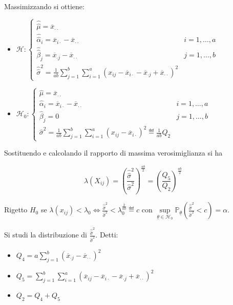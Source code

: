 \documentclass[hidelinks, 10pt]{report}
\begin{document}
Massimizzando si ottiene:
\begin{itemize}
\item $ \mathcal{H}: \begin{cases} \hat{\hat{\mu}} = \overline{x}_{\cdot \cdot} \\ \hat{\hat{\alpha}}_{i} = \overline{x}_{i \cdot} - \overline{x}_{\cdot \cdot} & i = 1, \dotsc, a  \\ \hat{\hat{\beta}}_{j} = \overline{x}_{\cdot j} - \overline{x}_{\cdot \cdot} & j = 1, \dotsc, b \\ \hat{\hat{\sigma}}^{2} = \frac{1}{ab} \sum\limits_{j = 1}^{b} \sum\limits_{i = 1}^{a} (x_{ij} - \overline{x}_{i \cdot} - \overline{x}_{\cdot j} + \overline{x}_{\cdot \cdot})^{2} \end{cases} $
\item $ \mathcal{H}_{0}: \begin{cases} \hat{\mu} = \overline{x}_{\cdot \cdot} \\ \hat{\alpha}_{i} = \overline{x}_{i \cdot} - \overline{x}_{\cdot \cdot} & i = 1, \dotsc, a \\ \hat{\beta}_{j} = 0 & j = 1, \dotsc, b \\ \hat{\sigma}^{2} = \frac{1}{ab} \sum\limits_{j = 1}^{b} \sum\limits_{i = 1}^{a} (x_{ij} - \overline{x}_{i \cdot})^{2} \eqdef \frac{1}{ab} Q_{2} \end{cases} $
\end{itemize}

Sostituendo e calcolando il rapporto di massima verosimiglianza si ha

\[ \lambda (X_{ij}) = \left( \frac{\hat{\hat{\sigma}}^{2}}{\hat{\sigma}^{2}} \right)^{\frac{ab}{2}} = \left( \frac{Q_{5}}{Q_{2}} \right)^{\frac{ab}{2}} \]

Rigetto $ H_{0} $ se $ \lambda (x_{ij}) < \lambda_{0} \iff \frac{\hat{\hat{\sigma}}^{2}}{\hat{\sigma}^{2}} < \lambda_{0}^{\frac{2}{ab}} \eqdef c $ con $ \sup\limits_{\underline{\theta} \in \mathcal{H}_{0}} \mathbb{P}_{\underline{\theta}} \left( \frac{\hat{\hat{\sigma}}^{2}}{\hat{\sigma}^{2}} < c \right) = \alpha $.

Si studi la distribuzione di $ \frac{\hat{\hat{\sigma}}^{2}}{\hat{\sigma}^{2}} $. Detti:
\begin{itemize}
\item $ Q_{4} = a \sum\limits_{j = 1}^{b} (\overline{x}_{\cdot j} - \overline{x}_{\cdot \cdot})^{2} $
\item $ Q_{5} = \sum\limits_{j = 1}^{b} \sum\limits_{i = 1}^{a} (\overline{x}_{i j} - \overline{x}_{i \cdot} - \overline{x}_{\cdot j} + \overline{x}_{\cdot \cdot})^{2} $
\item $ Q_{2} = Q_{4} + Q_{5} $
\end{itemize}
\end{document}
